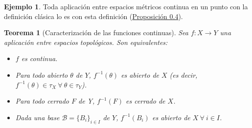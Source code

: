 \documentclass[12pt]{report}
\newtheorem{theorem}{Teorema}[chapter]
\theoremstyle{definition}
\theoremstyle{definition}
\newtheorem{example}{Ejemplo}[chapter]
\theoremstyle{remark}
\begin{document}
\begin{example}
Toda aplicación entre espacios métricos continua en un punto con la definición clásica lo es con esta definición (\hyperref[prop0.4.]{\color{blue}Proposición 0.4}).
\end{example}

\begin{theorem}[Caracterización de las funciones continuas]
Sea $f \colon X \to Y$ una aplicación entre espacios topológicos. Son equivalentes:
\begin{itemize}
    \item[(i)] $f$ es continua.
    \item[(ii)] Para todo abierto $\theta$ de $Y$, $f^{-1}(\theta)$ es abierto de $X$ (es decir, $f^{-1}(\theta) \in \tau_X \ \forall \ \theta \in \tau_Y$).
    \item[(iii)] Para todo cerrado $F$ de Y, $f^{-1}(F)$ es cerrado de $X$.
    \item[(iv)] Dada una base $\mathcal{B} = \{B_i\}_{i \in I}$ de $Y$, $f^{-1}(B_i)$ es abierto de $X \ \forall \ i \in I$.
\end{itemize}
\end{theorem}
\end{document}
